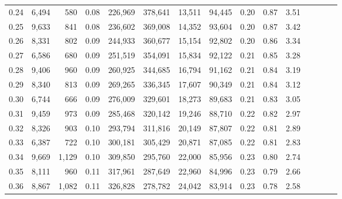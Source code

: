 \begin{tabular}{rrrcrrrrrrrrrrr}
0.24 &   6,494 &     580 &                                       0.08 &  226,969 &  378,641 &   13,511 &   94,445 &  0.20 &  0.87 &                         3.51 \\
0.25 &   9,633 &     841 &                                       0.08 &  236,602 &  369,008 &   14,352 &   93,604 &  0.20 &  0.87 &                         3.42 \\
0.26 &   8,331 &     802 &                                       0.09 &  244,933 &  360,677 &   15,154 &   92,802 &  0.20 &  0.86 &                         3.34 \\
0.27 &   6,586 &     680 &                                       0.09 &  251,519 &  354,091 &   15,834 &   92,122 &  0.21 &  0.85 &                         3.28 \\
0.28 &   9,406 &     960 &                                       0.09 &  260,925 &  344,685 &   16,794 &   91,162 &  0.21 &  0.84 &                         3.19 \\
0.29 &   8,340 &     813 &                                       0.09 &  269,265 &  336,345 &   17,607 &   90,349 &  0.21 &  0.84 &                         3.12 \\
0.30 &   6,744 &     666 &                                       0.09 &  276,009 &  329,601 &   18,273 &   89,683 &  0.21 &  0.83 &                         3.05 \\
0.31 &   9,459 &     973 &                                       0.09 &  285,468 &  320,142 &   19,246 &   88,710 &  0.22 &  0.82 &                         2.97 \\
0.32 &   8,326 &     903 &                                       0.10 &  293,794 &  311,816 &   20,149 &   87,807 &  0.22 &  0.81 &                         2.89 \\
0.33 &   6,387 &     722 &                                       0.10 &  300,181 &  305,429 &   20,871 &   87,085 &  0.22 &  0.81 &                         2.83 \\
0.34 &   9,669 &   1,129 &                                       0.10 &  309,850 &  295,760 &   22,000 &   85,956 &  0.23 &  0.80 &                         2.74 \\
0.35 &   8,111 &     960 &                                       0.11 &  317,961 &  287,649 &   22,960 &   84,996 &  0.23 &  0.79 &                         2.66 \\
0.36 &   8,867 &   1,082 &                                       0.11 &  326,828 &  278,782 &   24,042 &   83,914 &  0.23 &  0.78 &                         2.58 \\

\end{tabular}
